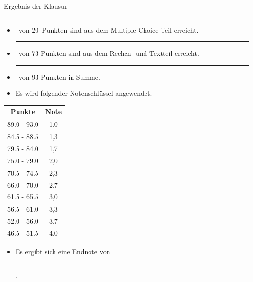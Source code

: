 \documentclass[a4paper, 9pt]{scrartcl}\usepackage[]{graphicx}\usepackage[]{xcolor}
\begin{document}
\begin{graybox}{Ergebnis der Klausur}
  \vspace{1Ex}
  \begin{itemize}
  \item[] \rule[0ex]{3em}{.4pt}\, von 20\, Punkten sind aus dem Multiple
    Choice Teil erreicht.
  \item[] \rule[0ex]{3em}{.4pt}\, von 73 Punkten sind aus dem Rechen- und
    Textteil erreicht. 
  \item[] \rule[0ex]{3em}{.4pt}\, von 93 Punkten in Summe.
  \item[] Es wird folgender Notenschl{\"u}ssel angewendet.   
  \end{itemize}
  \vspace{1ex}
\begin{center}
  \begin{tabular}[c]{cc}
    \toprule
    \textbf{Punkte}	&	\textbf{Note}	\\
    \midrule
    89.0 - 93.0	&	1,0	\\
    84.5 - 88.5	&	1,3	\\
    79.5 - 84.0	&	1,7	\\
    75.0 - 79.0	&	2,0	\\
    70.5 - 74.5	&	2,3	\\
    66.0 - 70.0	&	2,7	\\
    61.5 - 65.5	&	3,0	\\
    56.5 - 61.0	&	3,3	\\
    52.0 - 56.0	&	3,7	\\
    46.5 - 51.5	&	4,0	\\
    \bottomrule
  \end{tabular}
\end{center}
  \vspace{1ex}
\begin{itemize}
\item[] Es ergibt sich eine Endnote von \rule[0ex]{4em}{.4pt}.
\end{itemize}
  \vspace{1Ex}
\end{graybox}

\newpage
\end{document}
